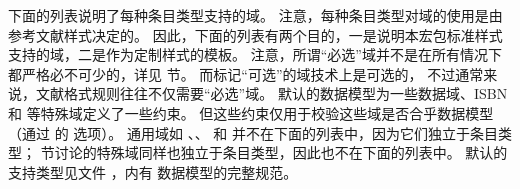 
下面的列表说明了每种条目类型支持的域。
注意，每种条目类型对域的使用是由参考文献样式决定的。
因此，下面的列表有两个目的，一是说明本宏包标准样式支持的域，二是作为定制样式的模板。
注意，所谓“必选”域并不是在所有情况下都严格必不可少的，详见  节。
而标记“可选”的域技术上是可选的，
不过通常来说，文献格式规则往往不仅需要“必选”域。
默认的数据模型为一些数据域、ISBN 和  等特殊域定义了一些约束。
但这些约束仅用于校验这些域是否合乎数据模型（通过 \biber 的  选项）。
通用域如 、、 和  并不在下面的列表中，因为它们独立于条目类型；
 节讨论的特殊域同样也独立于条目类型，因此也不在下面的列表中。
默认的支持类型见文件 ，内有 \biblatex 数据模型的完整规范。

